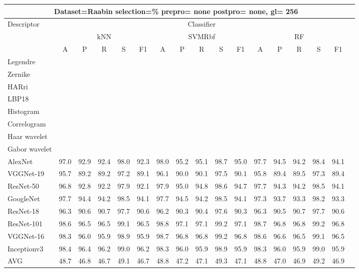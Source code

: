 \documentclass[12pt,italian]{article}
\begin{document}
\begin{tiny}
 \pagebreak 
\begin{longtable}{lcccccccccccccccc}
\toprule
\multicolumn{16}{c}{Dataset=Raabin selection=\% prepro= none postpro= none, gl= 256} \\ 
\toprule
Descriptor & \multicolumn{15}{c}{Classifier} \\ 
& \multicolumn{5}{c}{kNN} & \multicolumn{5}{c}{SVMRbf} & \multicolumn{5}{c}{RF} \\ 
& A & P & R & S & F1 & A & P & R & S & F1 & A & P & R & S & F1 \\ 
\midrule
Legendre \\ 
Zernike \\ 
HARri \\ 
LBP18 \\ 
Histogram \\ 
Correlogram \\ 
Haar wavelet \\ 
Gabor wavelet \\ 
AlexNet & 97.0 & 92.9 & 92.4 & 98.0 & 92.3 & 98.0 & 95.2 & 95.1 & 98.7 & 95.0 & 97.7 & 94.5 & 94.2 & 98.4 & 94.1 \\ 
VGGNet-19 & 95.7 & 89.2 & 89.2 & 97.2 & 89.1 & 96.1 & 90.0 & 90.1 & 97.5 & 90.1 & 95.8 & 89.4 & 89.5 & 97.3 & 89.4 \\ 
ResNet-50 & 96.8 & 92.8 & 92.2 & 97.9 & 92.1 & 97.9 & 95.0 & 94.8 & 98.6 & 94.7 & 97.7 & 94.3 & 94.2 & 98.5 & 94.1 \\ 
GoogleNet & 97.7 & 94.4 & 94.2 & 98.5 & 94.1 & 97.7 & 94.5 & 94.2 & 98.5 & 94.1 & 97.3 & 93.7 & 93.3 & 98.2 & 93.3 \\ 
ResNet-18 & 96.3 & 90.6 & 90.7 & 97.7 & 90.6 & 96.2 & 90.3 & 90.4 & 97.6 & 90.3 & 96.3 & 90.5 & 90.7 & 97.7 & 90.6 \\ 
ResNet-101 & 98.6 & 96.5 & 96.5 & 99.1 & 96.5 & 98.8 & 97.1 & 97.1 & 99.2 & 97.1 & 98.7 & 96.8 & 96.8 & 99.2 & 96.8 \\ 
VGGNet-16 & 98.3 & 96.0 & 95.9 & 98.9 & 95.9 & 98.7 & 96.8 & 96.8 & 99.2 & 96.8 & 98.6 & 96.6 & 96.5 & 99.1 & 96.5 \\ 
Inceptionv3 & 98.4 & 96.4 & 96.2 & 99.0 & 96.2 & 98.3 & 96.0 & 95.9 & 98.9 & 95.9 & 98.3 & 96.0 & 95.9 & 99.0 & 95.9 \\ 
\hline
AVG & 48.7 & 46.8 & 46.7 & 49.1 & 46.7 & 48.8 & 47.2 & 47.1 & 49.3 & 47.1 & 48.8 & 47.0 & 46.9 & 49.2 & 46.9 \\ 
\hline
\bottomrule
\end{longtable} 

 \pagebreak 
\end{tiny} 
 
\end{document}
